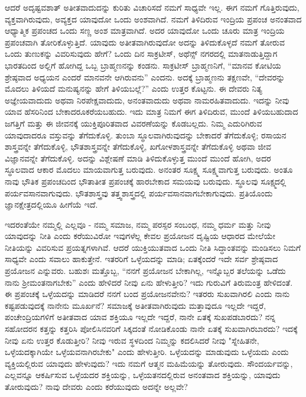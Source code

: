 ಆದರೆ ಅದೃಷ್ಟವಶಾತ್ ಅತೀತವಾದುದನ್ನು ಕುರಿತು ವಿಚಾರಿಸದೆ ನಮಗೆ ಸಾಧ್ಯವೇ ಇಲ್ಲ. ಈಗ ನಮಗೆ ಗೊತ್ತಿರುವುದು, ವ್ಯಕ್ತವಾಗಿರುವುದು, ಅವ್ಯಕ್ತದ ಯಾವುದೋ ಒಂದು ಅಂಶವಾಗಿದೆ. ನಮಗೆ ತಿಳಿದಿರುವ ಇಂದ್ರಿಯ ಪ್ರಪಂಚ ಅನಂತವಾದ ಆಧ್ಯಾತ್ಮಿಕ ಪ್ರಪಂಚದ ಒಂದು ಸಣ್ಣ ಅಂಶ ಮಾತ್ರವಾಗಿದೆ. ಅದರ ಯಾವುದೋ ಒಂದು ಚೂರು ಮಾತ್ರ ಇಂದ್ರಿಯ ಪ್ರಪಂಚವಾಗಿ ತೋರಿಕೊಳ್ಳುತ್ತಿದೆ. ಯಾವುದು ಅತೀತವಾಗಿರುವುದೋ ಅದನ್ನು ತಿಳಿದುಕೊಳ್ಳದೆ ನಮಗೆ ತೋರುವ ಒಂದು ತುಣುಕನ್ನು ವಿವರಿಸುವುದು ಹೇಗೆ? ಒಂದು ದಿನ ಸಾಕ್ರಟೀಸ್, ಅಥೆನ್ಸ್ ನಗರದಲ್ಲಿ ಮಾತನಾಡುತ್ತಿದ್ದಾಗ ಭಾರತದಿಂದ ಅಲ್ಲಿಗೆ ಹೋಗಿದ್ದ ಒಬ್ಬ ಬ್ರಾಹ್ಮಣನನ್ನು ಕಂಡನು. ಸಾಕ್ರಟೀಸ್ ಬ್ರಾಹ್ಮಣನಿಗೆ, “ಮಾನವ ಕೋಟಿಯ ಶ್ರೇಷ್ಠವಾದ ಅಧ್ಯಯನ ಎಂದರೆ ಮಾನವನೇ ಆಗಿರುವನು” ಎಂದನು. ಅದಕ್ಕೆ ಬ್ರಾಹ್ಮಣನು ತಕ್ಷಣವೇ, “ದೇವರನ್ನು ಮೊದಲು ತಿಳಿಯದೆ ಮನುಷ್ಯನನ್ನು ಹೇಗೆ ತಿಳಿಯಬಲ್ಲೆ?'' ಎಂದು ಉತ್ತರ ಕೊಟ್ಟನು. ಈ ದೇವರು ನಿತ್ಯ ಅಜ್ಞೇಯವಾದುದು ಅಥವಾ ನಿರಪೇಕ್ಷವಾದುದು, ಅನಂತವಾದುದು ಅಥವಾ ನಾಮರಹಿತವಾದುದು. ಇದನ್ನು ನೀವು ಯಾವ ಹೆಸರಿನಿಂದ ಬೇಕಾದರೂಕರೆಯಬಹುದು. ಇದು ಮಾತ್ರ ನಿಮಗೆ ಈಗ ತಿಳಿದಿರುವ, ಮುಂದೆ ತಿಳಿಯಬಹುದಾದ ಜಗತ್ತಿಗೆ ಮತ್ತು ಈ ಜೀವನಕ್ಕೆ ಯುಕ್ತಿಪೂರಿತವಾದ ವಿವರಣೆಯನ್ನು ಕೊಡಬಲ್ಲದು. ನಿಮ್ಮ ಎದುರಿಗಿರುವ ಯಾವುದಾದರೂ ವಸ್ತುವನ್ನು ತೆಗೆದುಕೊಳ್ಳಿ. ತುಂಬಾ ಸ್ಥೂಲವಾಗಿರುವುದನ್ನು ಬೇಕಾದರೆ ತೆಗೆದುಕೊಳ್ಳಿ; ರಸಾಯನ ಶಾಸ್ತ್ರವನ್ನೇ ತೆಗೆದುಕೊಳ್ಳಿ, ಭೌತಶಾಸ್ತ್ರವನ್ನೇ ತೆಗೆದುಕೊಳ್ಳಿ, ಖಗೋಳಶಾಸ್ತ್ರವನ್ನೇ ತೆಗೆದುಕೊಳ್ಳಿ ಅಥವಾ ಜೀವ ವಿಜ್ಞಾನವನ್ನೇ ತೆಗೆದುಕೊಳ್ಳಿ. ಅದನ್ನು ವಿಶ್ಲೇಷಣೆ ಮಾಡಿ ತಿಳಿದುಕೊಳ್ಳುತ್ತ ಮುಂದೆ ಮುಂದೆ ಹೋಗಿ, ಅದರ ಸ್ಥೂಲವಾದ ಆಕಾರ ಮೊದಲು ಮಾಯವಾಗುತ್ತ ಬರುವುದು. ಅನಂತರ ಸೂಕ್ಷ್ಮ ಸೂಕ್ಷ್ಮವಾಗುತ್ತ ಬರುವುದು. ಅಂತೂ ನಾವು ಭೌತಿಕ ಪ್ರಪಂಚದಿಂದ ಭೌತಾತೀತ ಪ್ರಪಂಚಕ್ಕೆ ಹಾರಬೇಕಾದ ಸಮಯವು ಬರುವುದು. ಸ್ಥೂಲವು ಸೂಕ್ಷ್ಮದಲ್ಲಿ ಪರ್ಯವಸಾನವಾಗುವುದು. ಭೌತಶಾಸ್ತ್ರವು ತತ್ತ್ವಶಾಸ್ತ್ರದಲ್ಲಿ ಪರ್ಯವಸಾನವಾಗಬೇಕಾಗುವುದು. ಪ್ರತಿಯೊಂದು ಜ್ಞಾನಕ್ಷೇತ್ರದಲ್ಲಿಯೂ ಹೀಗೆಯೆ ಇದೆ.

ಇದರಂತೆಯೇ ನಮ್ಮಲ್ಲಿ ಎಲ್ಲವೂ - ನಮ್ಮ ಸಮಾಜ, ನಮ್ಮ ಪರಸ್ಪರ ಸಂಬಂಧ, ನಮ್ಮ ಧರ್ಮ ಮತ್ತು ನೀವು ಯಾವುದನ್ನು ನೀತಿ ಎಂದು ಕರೆಯುವಿರೋ ಇವುಗಳೆಲ್ಲ ಕೇವಲ ಪ್ರಯೋಜನ ದೃಷ್ಟಿಯ ಆಧಾರದ ಮೇಲೆಯೇ ನೀತಿಯನ್ನು ವಿವರಿಸುವ ಪ್ರಯತ್ನಗಳಾಗಿವೆ. ಆದರೆ ಯುಕ್ತಿಯುತವಾದ ಒಂದು ನೀತಿ ಸಿದ್ಧಾಂತವನ್ನು ಮಂಡಿಸಲು ನಿಮಗೆ ಸಾಧ್ಯವೇ ಎಂದು ಸವಾಲು ಹಾಕುತ್ತೇನೆ. ಇತರರಿಗೆ ಒಳ್ಳೆಯದನ್ನು ಮಾಡಿ; ಏತಕ್ಕೆಂದರೆ ಇದೇ ಸರ್ವ ಶ್ರೇಷ್ಠವಾದ ಪ್ರಯೋಜನ ಎನ್ನುವರು. ಬಹುಶಃ ಮತ್ತೊಬ್ಬ, “ನನಗೆ ಪ್ರಯೋಜನ ಬೇಕಾಗಿಲ್ಲ, ಇನ್ನೊಬ್ಬರ ತಲೆಯನ್ನು ಒಡೆದು ನಾನು ಶ‍್ರೀಮಂತನಾಗಬೇಕು'' ಎಂದು ಹೇಳಿದರೆ ನೀವು ಏನು ಹೇಳುತ್ತೀರಿ? ಇದು ಗುರುವಿಗೆ ತಿರುಮಂತ್ರ ಹೇಳಿದಂತೆ. ಈ ಪ್ರಪಂಚಕ್ಕೆ ಒಳ್ಳೆಯದನ್ನು ಮಾಡಿದರೆ ನನಗೆ ಬಂದ ಪ್ರಯೋಜನವೇನು? ಇತರರು ಸುಖವಾಗಿರಲಿ ಎಂದು ನಾನು ಕಷ್ಟಪಡುವುದಕ್ಕೆ ನಾನೇನು ಮೂರ್ಖನೆ? ಸಮಾಜಕ್ಕೆ ಅತೀತವಾಗಿರುವುದು ಮತ್ತಾವುದೂ ಇಲ್ಲದೇ ಇದ್ದರೆ, ಪಂಚೇಂದ್ರಿಯಗಳಿಗೆ ಅತೀತವಾದ ಯಾವ ಶಕ್ತಿಯೂ ಇಲ್ಲದೇ ಇದ್ದರೆ, ನಾನೇ ಏತಕ್ಕೆ ಸುಖಪಡಬಾರದು? ನನ್ನ ಸಹೋದರನ ಕತ್ತನ್ನು ಕತ್ತರಿಸಿ ಪೋಲಿಸಿನವರಿಗೆ ಸಿಕ್ಕದಂತೆ ನೋಡಿಕೊಂಡು ನಾನೇ ಏತಕ್ಕೆ ಸುಖವಾಗಿರಬಾರದು? ಇದಕ್ಕೆ ನೀವು ಏನು ಉತ್ತರ ಕೊಡುತ್ತೀರಿ? ನೀವು ಇರುವ ಸ್ಥಳದಿಂದ ನಿಮ್ಮನ್ನು ಕದಲಿಸಿದರೆ ನೀವು "ಸ್ನೇಹಿತನೇ, ಒಳ್ಳೆಯದಕ್ಕಾಗಿಯೇ ಒಳ್ಳೆಯವನಾಗಿರಬೇಕು" ಎಂದು ಹೇಳುತ್ತೀರಿ. ಒಳ್ಳೆಯದನ್ನು ಮಾಡುವುದು ಒಳ್ಳೆಯದು ಎಂದು ವ್ಯಕ್ತಿಯಲ್ಲಿರುವ ಯಾವುದು ಹೇಳುವುದು? ಇದು ನಮಗೆ ಆತ್ಮನ ಮಹಿಮೆಯನ್ನು ತೋರುವುದು. ಸೌಂದರ್ಯವನ್ನು, ಎಲ್ಲವನ್ನೂ ಆಕರ್ಷಿಸುವ ಒಳ್ಳೆಯದರ ಶಕ್ತಿಯನ್ನು, ಒಳ್ಳೆಯತನದಲ್ಲಿರುವ ಅನಂತವಾದ ಶಕ್ತಿಯನ್ನು, ಯಾವುದು ತೋರುವುದು? ನಾವು ದೇವರು ಎಂದು ಕರೆಯುವುದು ಅದನ್ನೇ ಅಲ್ಲವೇ?

